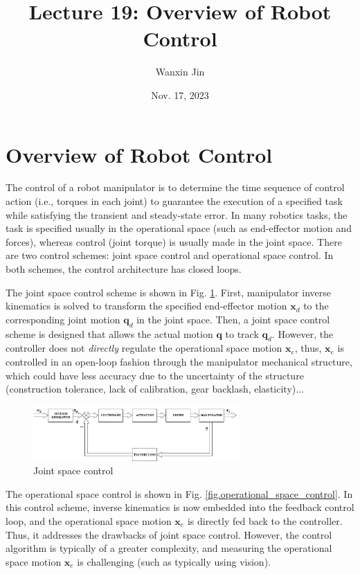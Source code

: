 \documentclass[10pt]{article}
\begin{document}
\title{Lecture 19: Overview of Robot Control}
\date{Nov. 17,  2023}
\author{Wanxin Jin}
\maketitle

\section{Overview of Robot Control}

The control of a robot manipulator is to determine the time sequence of control action (i.e., torques in each joint) to guarantee the execution of a specified task while satisfying the transient and steady-state error. In many robotics tasks, the task is specified usually in the operational space (such as end-effector motion and forces), whereas control (joint torque) is usually made in the joint space. There are two control schemes: joint space control and operational space control. In both schemes, the control architecture has closed loops. 


The joint space control scheme is shown in Fig. \ref{fig.joint_control}. First, manipulator inverse kinematics is solved to transform the specified end-effector motion  $\boldsymbol{x}_{d}$ to the corresponding joint motion $\boldsymbol{q}_{d}$ in the joint space. Then, a joint space control scheme is designed that allows the actual motion $\boldsymbol{q}$ to track $\boldsymbol{q}_{d}$. However, the controller does not \emph{directly} regulate the operational space  motion $\boldsymbol{x}_{e}$, thus, $\boldsymbol{x}_{e}$ is controlled in an open-loop fashion through the manipulator mechanical structure, which could have less accuracy due to the uncertainty of the structure (construction tolerance, lack of calibration, gear backlash, elasticity)...



\begin{figure}[H]
    \centering
    \includegraphics[max width=0.7\textwidth]{control/joint_control.jpg}
    \caption{Joint space control}
    \label{fig.joint_control}
\end{figure}


The operational space control  is shown in Fig. \ref{fig.operational_space_control}. In this control scheme,  inverse kinematics is now embedded into the feedback control loop, and the operational space  motion $\boldsymbol{x}_{e}$ is directly fed back to the controller. Thus, it addresses the drawbacks of joint space control. However, the control algorithm is typically of a greater  complexity, and measuring the operational space motion $\boldsymbol{x}_{e}$ is  challenging (such as typically using vision). 
\end{document}
